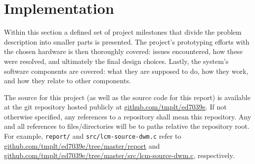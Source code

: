\section{Implementation}
Within this section a defined set of project milestones that divide the problem description into smaller parts is presented.
The project's prototyping efforts with the chosen hardware is then thoroughly covered:
issues encountered, how these were resolved, and ultimately the final design choices.
Lastly, the system's software components are covered: what they are supposed to do, how they work, and how they relate to other components.

The source for this project (as well as the source code for this report) is available at the git repository hosted publicly at \href{https://github.com/tmplt/ed7039e}{github.com/tmplt/ed7039e}.
If not otherwise specified, any references to a repository shall mean this repository.
Any and all references to files/directories will be to paths relative the repository root.
For example, \texttt{report/} and \texttt{src/lcm-source-dwm.c} refer to \href{https://github.com/tmplt/ed7039e/tree/master/report}{github.com/tmplt/ed7039e/tree/master/report} and \href{https://github.com/tmplt/ed7039e/tree/master/src/lcm-source-dwm.c}{github.com/tmplt/ed7039e/tree/master/src/lcm-source-dwm.c}, respectively.


